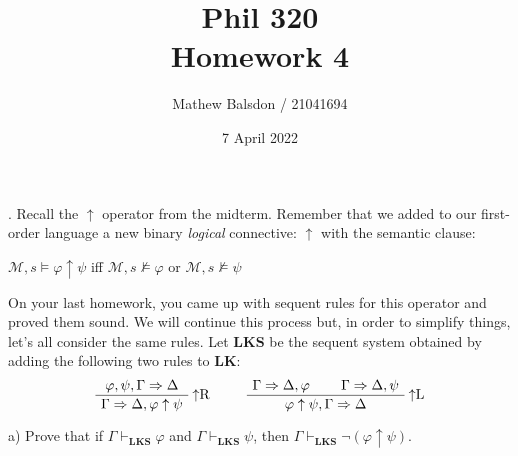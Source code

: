 \documentclass[11pt]{article}
\title{Phil 320\\Homework 4}
\author{Mathew Balsdon / 21041694}
\date{7 April 2022}%
\begin{document}
\maketitle

. Recall the $\uparrow$ operator from the midterm. Remember that we added to our first-order language a new binary \textit{logical} connective: $\uparrow$ with the semantic clause:
\begin{center}
    $\mathcal{M}, s \models \varphi \uparrow \psi$ iff $\mathcal{M}, s \not\models \varphi$ or $\mathcal{M}, s \not\models \psi$
\end{center}

On your last homework, you came up with sequent rules for this operator and proved them sound. We will continue this process but, in order to simplify things, let's all consider the same rules. Let $\mathbf{LKS}$ be the sequent system obtained by adding the following two rules to $\mathbf{LK}$:
\newenvironment{bprooftree}
  {\leavevmode\hbox\bgroup}
  {\DisplayProof\egroup}
\[
\begin{bprooftree}
\AxiomC{$\varphi, \psi, \Gamma \Rightarrow \Delta$}
\RightLabel{$\uparrow$R}
\UnaryInfC{$\Gamma \Rightarrow \Delta, \varphi \uparrow \psi$}
\end{bprooftree}\qquad
\begin{bprooftree}
\AxiomC{$\Gamma \Rightarrow \Delta, \varphi$}
\AxiomC{$\Gamma \Rightarrow \Delta, \psi$}
\RightLabel{$\uparrow$L}
\BinaryInfC{$\varphi \uparrow \psi, \Gamma \Rightarrow \Delta$}
\end{bprooftree}
\]

\noindent
a) Prove that if $\Gamma \vdash_{\mathbf{LKS}} \varphi$ and $\Gamma \vdash_{\mathbf{LKS}} \psi$, then $\Gamma \vdash_{\mathbf{LKS}} \neg(\varphi \uparrow \psi)$.
\end{document}
